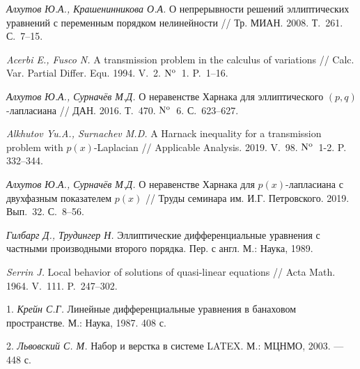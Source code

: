   \emph{Алхутов Ю.А., Крашенинникова О.А.} О непрерывности решений эллиптических уравнений с переменным порядком нелинейности // Тр. МИАН. 2008. Т.~261. С.~7--15.


 \emph{Acerbi E., Fusco N.} A transmission problem in the calculus of variations // Calc. Var. Partial Differ. Equ. 1994. V.~2.  ${\rm N^o}$\, 1. P.~1--16.


 \emph{Алхутов Ю.А., Сурначёв М.Д.} О неравенстве Харнака для эллиптического $(p,q)$-лапласиана // ДАН. 2016. Т.~470. ${\rm N^o}$\, 6. С.~623--627.

 \emph{Alkhutov Yu.A., Surnachev M.D.} A Harnack inequality for a transmission problem with $p(x)$-Laplacian // Applicable Analysis. 2019. V.~98. ${\rm N^o}$\, 1-2. P. 332--344.

 \emph{Алхутов Ю.А., Сурначёв М.Д.} О неравенстве Харнака для $p(x)$-лапласиана с двухфазным показателем $p(x)$ // Труды семинара им. И.Г. Петровского. 2019. Вып.~32. С.~8--56.


 \emph{Гилбарг Д., Трудингер Н.} Эллиптические дифференциальные уравнения с частными производными второго порядка. Пер. с англ. М.: Наука, 1989. 

 \emph{Serrin J.} Local behavior of solutions of quasi-linear equations // Acta Math. 1964. V.~111. P.~247--302.



1. {\it Крейн С.Г.} Линейные дифференциальные уравнения в банаховом пространстве. М.: Наука, 1987. 408 с.

2. {\it Львовский С. М.} Набор и верстка в системе LATEX. М.: МЦНМО, 2003. — 448 с.

\fi
